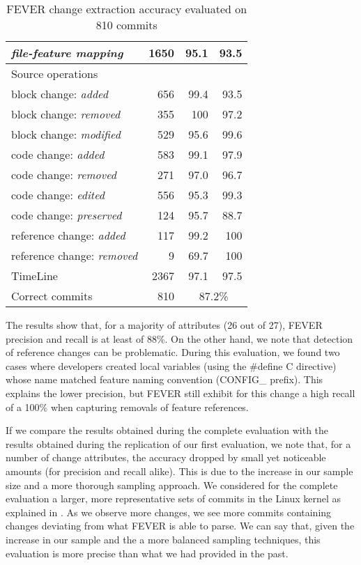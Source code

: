 \begin{table}[t]
{\begin{tabular}{|l|r|r|r|}
\textit{file-feature mapping} 			& 1650  & 95.1  & 93.5	\\
\hline
Source operations						&  &  & \\
block change: \textit{added}				& 656 & 99.4 & 93.5	 \\
block change: \textit{removed}			& 355 & 100 & 97.2	 \\
block change: \textit{modified} 			& 529 & 95.6  & 99.6	 \\
code change: \textit{added}  			& 583 & 99.1  & 97.9	 \\
code change: \textit{removed}			& 271 & 97.0  & 96.7	 \\
code change: \textit{edited}				& 556 & 95.3  & 99.3	 \\
code change: \textit{preserved}			&  124 & 95.7  & 88.7 \\
reference change: \textit{added}			& 117 & 99.2   & 100  \\
reference change: \textit{removed}		& 9 & 69.7    & 100   \\
\hline
TimeLine 								& 2367 & 97.1 & 97.5  \\
\hline
\hline
Correct commits							& 810 & \multicolumn{2}{c|}{87.2\%} \\
\hline
\end{tabular}
}
\caption{FEVER change extraction accuracy evaluated on 810 commits}
\label{complete_review}
\end{table}

The results show that, for a majority of attributes (26 out of 27), FEVER precision and recall is at least of 88\%.
On the other hand, we note that detection of reference changes can be problematic.
During this evaluation, we found two cases where developers created local variables
(using the \#define C directive) whose name matched feature naming convention (CONFIG\_ prefix).
This explains the lower precision, but FEVER still exhibit for this change a high recall of a 100\%  
when capturing removals of feature references.

If we compare the results obtained during the complete evaluation with the results obtained during the replication of our first evaluation, we note
that, for a number of change attributes, the accuracy dropped by small yet noticeable amounts (for precision and recall alike).
This is due to the increase in our sample size and a more thorough sampling approach. We considered for the complete evaluation a larger,
more representative sets of commits in the Linux kernel as explained in .
As we observe more changes, we see more commits containing changes deviating from what FEVER is able to parse.
We can say that, given the increase in our sample and the a more balanced sampling techniques, this evaluation is more precise than what 
we had provided in the past. 


